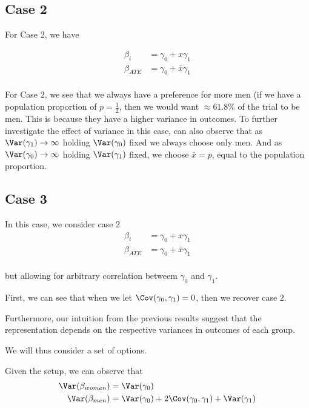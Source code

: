 \subsection*{Case 2}

For Case 2, we have 

\begin{align*}
	\beta_i &=  \gamma_0 + x \gamma_1 \\
	\beta_{ATE} &=  \gamma_0 + \bar{x} \gamma_1 \\
\end{align*}


For Case $2$, we see that we always have a preference for more men (if we have a population proportion of $p = \frac{1}{2}$, then we would want $\approx 61.8 \%$ of the trial to be men.
This is because they have a higher variance in outcomes. To further investigate the effect of variance in this case, can also observe that as $\Var(\gamma_1) \to \infty$ holding $\Var(\gamma_0)$ fixed we always choose only men.
And as $\Var(\gamma_0) \to \infty$ holding $\Var(\gamma_1)$ fixed, we choose $\bar{x} = p$, equal to the population proportion.

\subsection*{Case 3}

In this case, we consider case 2
\begin{align*}
	\beta_i &=  \gamma_0 + x \gamma_1 \\
	\beta_{ATE} &=  \gamma_0 + \bar{x} \gamma_1 \\
\end{align*}

but allowing for arbitrary correlation betweem $\gamma_0$ and $\gamma_1$.

First, we can see that when we let  $\Cov(\gamma_0, \gamma_1) = 0$, then we recover case 2.

Furthermore, our intuition from the previous results suggest that the representation depends on the respective variances in outcomes of each group.

We will thus consider a set of options.

Given the setup, we can observe that
\begin{align*}
	\Var(\beta_{women}) &= \Var(\gamma_0) \\
	\Var(\beta_{men}) &= \Var(\gamma_0) + 2\Cov(\gamma_0, \gamma_1) + \Var(\gamma_1) \\
\end{align*} 

